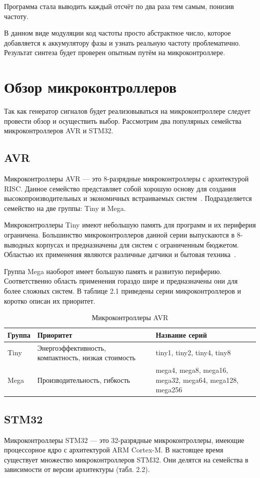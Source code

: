 	Программа стала выводить каждый отсчёт по два раза тем самым, понизив частоту.
	
	В данном виде модуляции код частоты просто абстрактное число, которое добавляется к аккумулятору фазы и узнать реальную частоту проблематично. Результат синтеза будет проверен опытным путём на микроконтроллере.
	
\section{Обзор микроконтроллеров}
	Так как генератор сигналов будет реализовываться на микроконтроллере следует провести обзор и осуществить выбор. Рассмотрим два популярных семейства микроконтроллеров AVR и STM32.
\subsection{AVR}
	Микроконтроллеры AVR --- это 8-разрядные микроконтроллеры с архитектурой RISC. Данное семейство представляет собой хорошую основу для создания высокопроизводительных и экономичных встраиваемых систем~\cite{avr}. Подразделяется семейство на две группы: Tiny и Mega.
	
	Микроконтроллеры Tiny имеют небольшую память для программ и их периферия ограничена. Большинство микроконтроллеров данной серии выпускаются в 8-выводных корпусах и предназначены для систем с ограниченным бюджетом. Областью их применения являются различные датчики и бытовая техника~\cite{avr}.
	
	Группа Mega наоборот имеет большую память и развитую периферию. Соответственно область применения гораздо шире и предназначены они для более сложных систем. В таблице 2.1 приведены серии микроконтроллеров и коротко описан их приоритет.

\begin{table}[H]
\caption{Микроконтроллеры AVR}
\begin{tabular}{|p{3.25 cm}|p{8 cm}|p{4 cm}|}
\hline
Группа & Приоритет & Название серий \\ \hline
Tiny & Энергоэффективность, компактность, низкая стоимость & tiny1, tiny2, tiny4, tiny8 \\ \hline
Mega & Производительность, гибкость & mega4, mega8, mega16, mega32, mega64, mega128, mega256 \\ \hline
\end{tabular}
\end{table}

\subsection{STM32}
	Микроконтроллеры STM32 --- это 32-разрядные микроконтроллеры, имеющие процессорное ядро с архитектурой ARM Cortex-M. В настоящее время существует множество микроконтроллеров STM32. Они делятся на семейства в зависимости от версии архитектуры (табл. 2.2).

